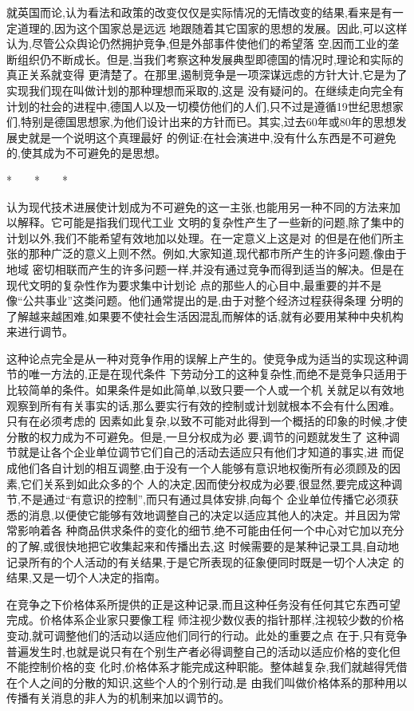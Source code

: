 ﻿\documentclass[12pt]{article}
\begin{document}
就英国而论,认为看法和政策的改变仅仅是实际情况的无情改变的结果,看来是有一定道理的,因为这个国家总是远远
地跟随着其它国家的思想的发展。因此,可以这样认为,尽管公众舆论仍然拥护竞争,但是外部事件使他们的希望落
空,因而工业的垄断组织仍不断成长。但是,当我们考察这种发展典型即德国的情况时,理论和实际的真正关系就变得
更清楚了。在那里,遏制竞争是一项深谋远虑的方针大计,它是为了实现我们现在叫做计划的那种理想而采取的,这是
没有疑问的。在继续走向完全有计划的社会的进程中,德国人以及一切模仿他们的人们,只不过是遵循19世纪思想家
们,特别是德国思想家,为他们设计出来的方针而已。其实,过去60年或80年的思想发展史就是一个说明这个真理最好
的例证:在社会演进中,没有什么东西是不可避免的,使其成为不可避免的是思想。

*　　*　　*

认为现代技术进展使计划成为不可避免的这一主张,也能用另一种不同的方法来加以解释。它可能是指我们现代工业
文明的复杂性产生了一些新的问题,除了集中的计划以外,我们不能希望有效地加以处理。在一定意义上这是对
的\myrule 但是在他们所主张的那种广泛的意义上则不然。例如,大家知道,现代都市所产生的许多问题,像由于地域
密切相联而产生的许多问题一样,并没有通过竞争而得到适当的解决。但是在现代文明的复杂性作为要求集中计划论
点的那些人的心目中,最重要的并不是像``公共事业''这类问题。他们通常提出的是,由于对整个经济过程获得条理
分明的了解越来越困难,如果要不使社会生活因混乱而解体的话,就有必要用某种中央机构来进行调节。

这种论点完全是从一种对竞争作用的误解上产生的。使竞争成为适当的实现这种调节的唯一方法的,正是在现代条件
下劳动分工的这种复杂性,而绝不是竞争只适用于比较简单的条件。如果条件是如此简单,以致只要一个人或一个机
关就足以有效地观察到所有有关事实的话,那么要实行有效的控制或计划就根本不会有什么困难。只有在必须考虑的
因素如此复杂,以致不可能对此得到一个概括的印象的时候,才使分散的权力成为不可避免。但是,一旦分权成为必
要,调节的问题就发生了 \myrule 这种调节就是让各个企业单位调节它们自己的活动去适应只有他们才知道的事实,进
而促成他们各自计划的相互调整,由于没有一个人能够有意识地权衡所有必须顾及的因素,它们关系到如此众多的个
人的决定,因而使分权成为必要,很显然,要完成这种调节,不是通过``有意识的控制'',而只有通过具体安排,向每个
企业单位传播它必须获悉的消息,以便使它能够有效地调整自己的决定以适应其他人的决定。并且因为常常影响着各
种商品供求条件的变化的细节,绝不可能由任何一个中心对它加以充分的了解,或很快地把它收集起来和传播出去,这
时候需要的是某种记录工具,自动地记录所有的个人活动的有关结果,于是它所表现的征象便同时既是一切个人决定
的结果,又是一切个人决定的指南。

在竞争之下价格体系所提供的正是这种记录,而且这种任务没有任何其它东西可望完成。价格体系企业家只要像工程
师注视少数仪表的指针那样,注视较少数的价格变动,就可调整他们的活动以适应他们同行的行动。此处的重要之点
在于,只有竞争普遍发生时,也就是说只有在个别生产者必得调整自己的活动以适应价格的变化但不能控制价格的变
化时,价格体系才能完成这种职能。整体越复杂,我们就越得凭借在个人之间的分散的知识,这些个人的个别行动,是
由我们叫做价格体系的那种用以传播有关消息的非人为的机制来加以调节的。
\end{document}
